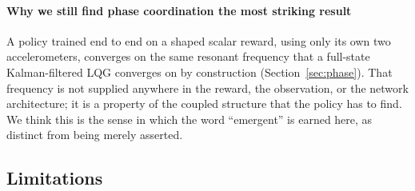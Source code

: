 \documentclass[preprint,11pt,authoryear]{elsarticle}
\begin{document}
\paragraph{Why we still find phase coordination the most striking result}
A policy trained end to end on a shaped scalar reward, using only its own two
accelerometers, converges on the same resonant frequency that a full-state
Kalman-filtered LQG converges on by construction (Section~\ref{sec:phase}). That
frequency is not supplied anywhere in the reward, the observation, or the
network architecture; it is a property of the coupled structure that the policy
has to find. We think this is the sense in which the word ``emergent'' is
earned here, as distinct from being merely asserted.

\subsection{Limitations}
\label{sec:limitations}
\end{document}
